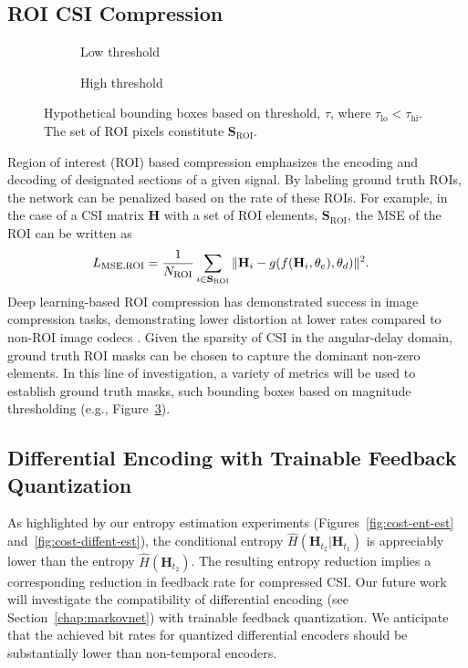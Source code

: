 \subsection{ROI CSI Compression}

\begin{figure}[htb] \centering 
	\begin{subfigure}[t]{.48\textwidth}
		
		\caption{Low threshold} 
		\label{fig:roi-lo} 
	\end{subfigure}
	\begin{subfigure}[t]{.48\textwidth}
		
		\caption{High threshold} 
		\label{fig:roi-hi} 
	\end{subfigure}
	\caption{Hypothetical bounding boxes based on threshold, $\tau$, where $\tau_{\text{lo}} < \tau_{\text{hi}}$. The set of ROI pixels constitute $\mathbf S_{\text{ROI}}$.} 
  	\label{fig:roi-thresh} 
\end{figure}

Region of interest (ROI) based compression emphasizes the encoding and decoding of designated sections of a given signal. By labeling ground truth ROIs, the network can be penalized based on the rate of these ROIs. For example, in the case of a CSI matrix $\mathbf H$ with a set of ROI elements, $\mathbf S_{\text{ROI}}$, the MSE of the ROI can be written as
\begin{align*}
	L_{\text{MSE,ROI}} &= \frac{1}{N_{\text{ROI}}} \sum_{i\in\mathbf S_{\text{ROI}}}\Arrowvert \mathbf H_i - g(f(\mathbf H_i, \theta_e), \theta_d) \Arrowvert^2.
\end{align*}
Deep learning-based ROI compression has demonstrated success in image compression tasks, demonstrating lower distortion at lower rates compared to non-ROI image codecs \cite{ref:Cai2020EndToEndOptimizedROIImageCompression}. Given the sparsity of CSI in the angular-delay domain, ground truth ROI masks can be chosen to capture the dominant non-zero elements. In this line of investigation, a variety of metrics will be used to establish ground truth masks, such bounding boxes based on magnitude thresholding (e.g., Figure~\ref{fig:roi-thresh}). 

\subsection{Differential Encoding with Trainable Feedback Quantization}

As highlighted by our entropy estimation experiments (Figures~\ref{fig:cost-ent-est} and~\ref{fig:cost-diffent-est}), the conditional entropy $\hat H(\mathbf H_{t_2}|\mathbf H_{t_1})$ is appreciably lower than the entropy $\hat H(\mathbf H_{t_2})$. The resulting entropy reduction implies a corresponding reduction in feedback rate for compressed CSI. Our future work will investigate the compatibility of differential encoding (see Section~\ref{chap:markovnet}) with trainable feedback quantization. We anticipate that the achieved bit rates for quantized differential encoders should be substantially lower than non-temporal encoders.

